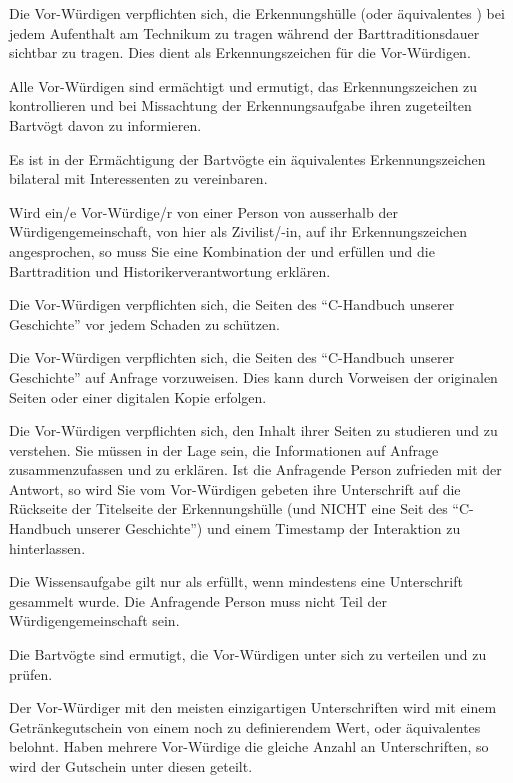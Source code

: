 \documentclass[fontsize=12pt,parskip=half]{scrartcl}
\begin{document}
\begin{contract}
  \SubClause[title={Erkennungsaufgabe}]\label{H.erkennungsaufgabe}
  Die Vor-Würdigen verpflichten sich, die Erkennungshülle (oder äquivalentes ) bei jedem Aufenthalt am Technikum zu tragen während der
  Barttraditionsdauer sichtbar zu tragen. Dies dient als Erkennungszeichen für die Vor-Würdigen.

  Alle Vor-Würdigen sind ermächtigt und ermutigt, das Erkennungszeichen zu kontrollieren und bei Missachtung der Erkennungsaufgabe ihren zugeteilten Bartvögt davon zu informieren.

  Es ist in der Ermächtigung der Bartvögte ein äquivalentes Erkennungszeichen bilateral mit Interessenten zu vereinbaren.\label{aequivalentes}

  Wird ein/e Vor-Würdige/r von einer Person von ausserhalb der Würdigengemeinschaft, von hier als Zivilist/-in, auf ihr Erkennungszeichen angesprochen, so muss Sie eine Kombination
  der  und  erfüllen und die Barttradition und Historikerverantwortung  erklären.

  \SubClause[title={Schutzaufgabe}]\label{H.schutzaufgabe}
  Die Vor-Würdigen verpflichten sich, die Seiten des ``C-Handbuch unserer Geschichte'' vor jedem Schaden zu schützen.

  \SubClause[title={Vorweisaufgabe}]\label{H.vorweisaufgabe}
  Die Vor-Würdigen verpflichten sich, die Seiten des ``C-Handbuch unserer Geschichte'' auf Anfrage vorzuweisen. Dies kann durch Vorweisen der originalen
  Seiten oder einer digitalen Kopie erfolgen.

  \SubClause[title={Wissensaufgabe}]\label{H.wissensaufgabe}
  Die Vor-Würdigen verpflichten sich, den Inhalt ihrer Seiten zu studieren und zu verstehen. Sie müssen in der Lage sein, die Informationen
  auf Anfrage zusammenzufassen und zu erklären. Ist die Anfragende Person zufrieden mit der Antwort, so wird Sie vom Vor-Würdigen gebeten
  ihre Unterschrift auf die Rückseite der Titelseite der Erkennungshülle (und NICHT eine Seit des ``C-Handbuch unserer Geschichte'') und einem
  Timestamp der Interaktion zu hinterlassen.

  Die Wissensaufgabe gilt nur als erfüllt, wenn mindestens eine Unterschrift gesammelt wurde. Die Anfragende Person muss nicht Teil der Würdigengemeinschaft sein.

  Die Bartvögte sind ermutigt, die Vor-Würdigen unter sich zu verteilen und zu prüfen.

  Der Vor-Würdiger mit den meisten einzigartigen Unterschriften wird mit einem Getränkegutschein von einem noch zu definierendem Wert, oder äquivalentes
  belohnt. Haben mehrere Vor-Würdige die gleiche Anzahl an Unterschriften, so wird der Gutschein unter diesen geteilt.


\end{contract}
\end{document}
